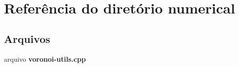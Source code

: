 \section{Referência do diretório numerical}
\label{dir_15bb5993407424156e258eeb5c7a7be4}
\subsection*{Arquivos}
\begin{DoxyCompactItemize}
\item 
arquivo {\bf voronoi-\/utils.\+cpp}
\end{DoxyCompactItemize}

